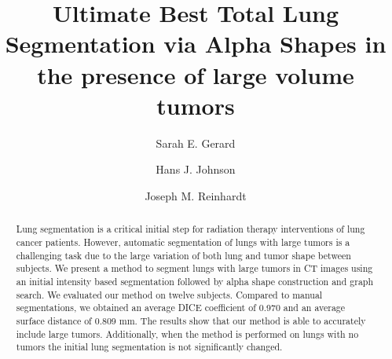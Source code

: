 \documentclass{llncs}
\begin{document}
%
\frontmatter          %
%
\pagestyle{headings}  %
%

%
\tableofcontents
%
\listoftodos

\mainmatter              %
%
\title{Ultimate Best Total Lung Segmentation via Alpha Shapes in the presence of large volume tumors}
%
%
\author{Sarah E. Gerard \and Hans J. Johnson
\and Joseph M. Reinhardt}
%
%
%


\maketitle              %

\begin{abstract}
Lung segmentation is a critical initial step for radiation therapy interventions of lung cancer patients. However, automatic segmentation of lungs with large tumors is a challenging task due to the large variation of both lung and tumor shape between subjects. We present a method to segment lungs with large tumors in CT images using an initial intensity based segmentation followed by alpha shape construction and graph search. We evaluated our method on twelve subjects. Compared to manual segmentations, we obtained an average DICE coefficient of 0.970 and an average surface distance of 0.809 mm. The results show that our method is able to accurately include large tumors. Additionally, when the method is performed on lungs with no tumors the initial lung segmentation is not significantly changed. 

\end{abstract}
%
\end{document}
